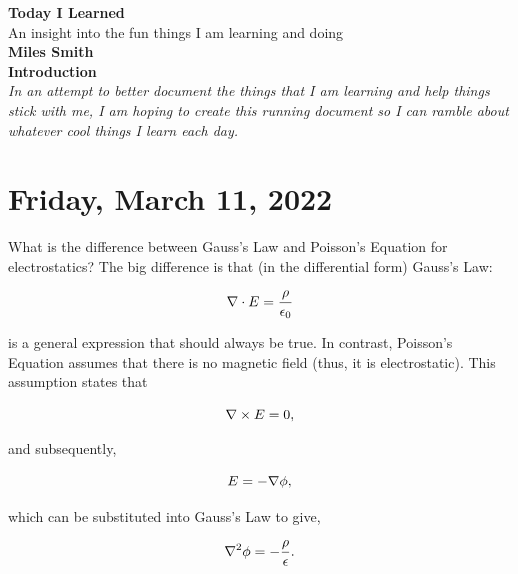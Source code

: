 \documentclass[12pt]{article}
\begin{document}
\begin{center}
\huge{\textbf{Today I Learned}}\\
\large{An insight into the fun things I am learning and doing}\\

\vspace*{0.5cm}
\textbf{Miles Smith}\\

\vspace*{1cm}
\textbf{Introduction}\\
\textit{In an attempt to better document the things that I am learning and help things stick with me, I am hoping to create this running document so I can ramble about whatever cool things I learn each day.}\\
\vspace*{2cm}
\clearpage

\end{center}

\section{Friday, March 11, 2022}

\par
What is the difference between Gauss's Law and Poisson's Equation for electrostatics? The big difference is that (in the differential form) Gauss's Law:

\begin{equation}
\centering
\nabla \cdot E = \frac{\rho}{\epsilon_0}
\end{equation}

is a general expression that should always be true. In contrast, Poisson's Equation assumes that there is no magnetic field (thus, it is electrostatic). This assumption states that 

\begin{equation}
\centering
\nabla \times E = 0,
\end{equation}

and subsequently,

\begin{equation}
\centering
E = - \nabla \phi,
\end{equation}

which can be substituted into Gauss's Law to give,

\begin{equation}
\centering
\nabla^2\phi = -\frac{\rho}{\epsilon}.
\end{equation}
\end{document}
